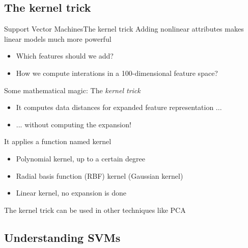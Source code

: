 \documentclass[10pt,compress]{beamer} %
\begin{document}
\subsection{The kernel trick}
\begin{frame}{Support Vector Machines}{The kernel trick}
    Adding nonlinear attributes makes linear models much more powerful
    \begin{itemize}
        \item Which features should we add?
        \item How we compute interations in a 100-dimensional feature space?
    \end{itemize}

    Some mathematical magic: The \textit{kernel trick}
    \begin{itemize}
        \item It computes data distances for expanded feature representation ...
        \item ... without computing the expansion!
    \end{itemize}

    It applies a function named \alert{kernel}
    \begin{itemize}
        \item Polynomial kernel, up to a certain degree
        \item Radial basis function (RBF) kernel (Gaussian kernel)
        \item Linear kernel, no expansion is done
    \end{itemize}
    The kernel trick can be used in other techniques like PCA
\end{frame}

\subsection{Understanding SVMs}
\end{document}
